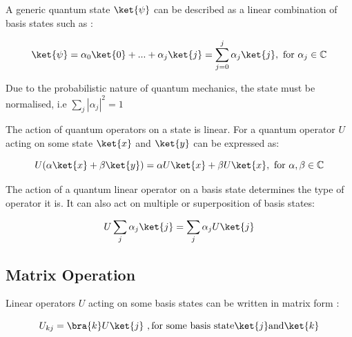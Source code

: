 \documentclass{article}
\begin{document}
\noindent
A generic quantum state $\ket{\psi}$ can be described as a linear combination of basis states such as \cite{noauthor_lecture_nodate}:
\vspace{5mm}


\begin{equation}
\ket{\psi} = \alpha_0\ket{0} + ... + \alpha_j\ket{j} = \sum\limits_{j = 0}^{j} \alpha_j\ket{j} , \ \text{for} \ \alpha_j \in \mathbb{C}
\end{equation}
\vspace{5mm}

\noindent
Due to the probabilistic nature of quantum mechanics, the state must be normalised, i.e $\sum\limits_j |\alpha_j|^2 = 1$
\vspace{5mm}

\noindent
The action of quantum operators on a state is linear. For a quantum operator $U$ acting on some state $\ket{x}$ and $\ket{y}$ can be expressed as:
\vspace{5mm}

\noindent
\begin{equation}
U(\alpha\ket{x} + \beta\ket{y}) = \alpha U\ket{x} + \beta U\ket{x} , \ \text{for} \ \alpha, \beta \in \mathbb{C}
\end{equation}
\vspace{5mm}

\noindent
The action of a quantum linear operator on a basis state determines the type of operator it is. It can also act on multiple or superposition of basis states:
\vspace{5mm}

\noindent
\begin{equation}
U \sum\limits_j \alpha_j \ket{j} = \sum\limits_j \alpha_j U\ket{j}
\end{equation}
\vspace{10mm}

\subsection{Matrix Operation}
\vspace{5mm}

\noindent
Linear operators $U$ acting on some basis states can be written in matrix form \cite{noauthor_lecture_nodate}:
\vspace{5mm}

\begin{equation}
U_{kj} = \bra{k}U\ket{j} \ , \text{for some basis state} \ket{j} \text{and} \ket{k} 
\end{equation}
\vspace{5mm}
\end{document}
